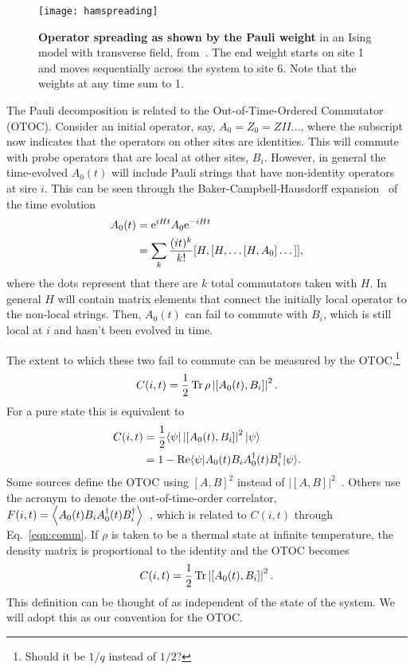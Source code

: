 \begin{figure}
	\centering
	\texttt{[image: hamspreading]}
	\caption{\textbf{Operator spreading as shown by the Pauli weight} in an Ising model with transverse field, from~\cite{Jonay17}. The end weight starts on site 1 and moves sequentially across the system to site 6. Note that the weights at any time sum to 1.}
	\label{fig:hamspreading}
\end{figure}

The Pauli decomposition is related to the Out-of-Time-Ordered Commutator (OTOC). Consider an initial operator, say, $A_0=Z_0=ZII\dots$, where the subscript now indicates that the operators on other sites are identities. This will commute with probe operators that are local at other sites, $B_i$. However, in general the time-evolved $A_0(t)$ will include Pauli strings that have non-identity operators at sire $i$. This can be seen through the Baker-Campbell-Hausdorff expansion~\cite{Roberts2016} of the time evolution
\begin{align}
A_0(t) &= \text{e}^{iHt}A_0\text{e}^{-iHt} \nonumber\\
&= \sum_k\frac{(it)^k}{k!}[H,[H,\dots[H,A_0]\dots]],\label{eqn:BCH}
\end{align}
where the dots represent that there are $k$ total commutators taken with $H$.
In general $H$ will contain matrix elements that connect the initially local operator to the non-local strings. Then, $A_0(t)$ can fail to commute with $B_i$, which is still local at $i$ and hasn't been evolved in time.

The extent to which these two fail to commute can be measured by the OTOC,\footnote{Should it be $1/q$ instead of $1/2$?}
\begin{align}
C(i,t) = \frac{1}{2}\operatorname{Tr} \rho \left|[A_0(t),B_i]\right|^2.\nonumber
\end{align}
For a pure state this is equivalent to~\cite{Keyserlingk, Jonay18}
\begin{align}
C(i,t) &= \frac{1}{2}\langle\psi|\left|[A_0(t),B_i]\right|^2|\psi\rangle\nonumber\\
&= 1-\operatorname{Re}\langle\psi|A_0(t)B_iA_0^\dag(t)B_i^\dag|\psi\rangle. \label{eqn:comm}
\end{align}
Some sources define the OTOC using $[A,B]^2$ instead of $|[A,B]|^2$~\cite{Jonay, Roberts2016, Nahum2017}. Others use the acronym to denote the out-of-time-order correlator, $F(i,t) = \left\langle A_0(t)B_iA_0^\dag(t)B^\dag_i \right\rangle$~\cite{Who}, which is related to $C(i,t)$ through Eq.~\ref{eqn:comm}. If $\rho$ is taken to be a thermal state at infinite temperature, the density matrix is proportional to the identity and the OTOC becomes
\begin{align}
C(i,t) = \frac{1}{2}\operatorname{Tr} \left|[A_0(t),B_i]\right|^2.
\end{align}
This definition can be thought of as independent of the state of the system. We will adopt this as our convention for the OTOC.

